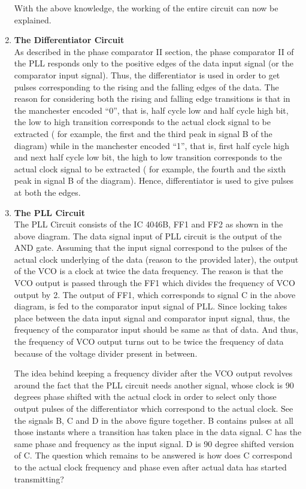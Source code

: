 \documentclass{article}
\begin{document}
\begin{enumerate}[label=(\Alph*)]
With the above knowledge, the working of the entire circuit can now be explained.


\item \textbf{The Differentiator Circuit}\\
  As described in the phase comparator II section, the phase comparator II of the PLL responds only to the positive edges of the data input signal (or the comparator input signal). Thus, the differentiator is used in order to get pulses corresponding to the rising and the falling edges of the data. The reason for considering both the rising and falling edge transitions is that in the manchester encoded “0”, that is, half cycle low and half cycle high bit, the low to high transition corresponds to the actual clock signal to be extracted ( for example, the first and the third peak in signal B of the diagram) while in the manchester encoded “1”, that is, first half cycle high and next half cycle low bit, the high to low transition corresponds to the actual clock signal to be extracted ( for example, the fourth and the sixth peak in signal B of the diagram). Hence, differentiator is used to give pulses at both the edges.

\item \textbf{The PLL Circuit}\\
  The PLL Circuit consists of the IC 4046B, FF1 and FF2 as shown in the above diagram. The data signal input of PLL circuit is the output of the AND gate. Assuming that the input signal correspond to the pulses of the actual clock underlying of the data (reason to the provided later), the output of the VCO is a clock at twice the data frequency. The reason is that the VCO output is passed through the FF1 which divides the frequency of VCO output by 2. The output of FF1, which corresponds to signal C in the above diagram, is fed to the comparator input signal of PLL. Since locking takes place between the data input signal and comparator input signal, thus, the frequency of the comparator input should be same as that of data. And thus, the frequency of VCO output turns out to be twice the frequency of data because of the voltage divider present in between.

  The idea behind keeping a frequency divider after the VCO output revolves around the fact that the PLL circuit needs another signal, whose clock is 90 degrees phase shifted with the actual clock in order to select only those output pulses of the differentiator which correspond to the actual clock. See the signals B, C and D in the above figure together. B contains pulses at all those instants where a transition has taken place in the data signal. C has the same phase and frequency as the input signal. D is 90 degree shifted version of C. The question which remains to be answered is how does C correspond to the actual clock frequency and phase even after actual data has started transmitting?
  

\end{enumerate}
\end{document}
